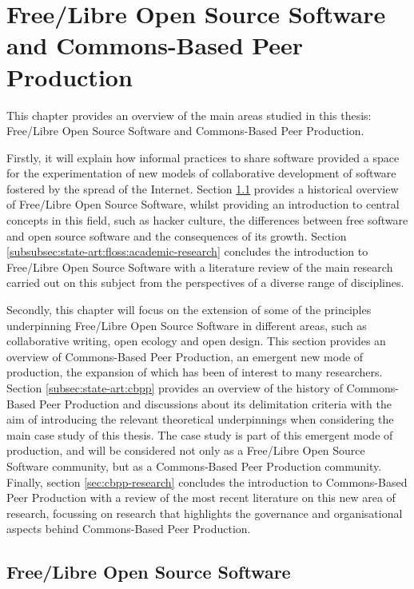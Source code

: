 \chapter{Free\slash Libre Open Source Software and Commons-Based Peer Production}
\label{chapter:introduction}

This chapter provides an overview of the main areas studied in this thesis: Free\slash Libre Open Source Software and Commons-Based Peer Production.

Firstly, it will explain how informal practices to share software provided a space for the experimentation of new models of collaborative development of software fostered by the spread of the Internet. Section \ref{subsec:state-art:floss} provides a historical overview of Free\slash Libre Open Source Software, whilst providing an introduction to central concepts in this field, such as hacker culture, the differences between free software and open source software and the consequences of its growth. Section \ref{subsubsec:state-art:floss:academic-research} concludes the introduction to Free\slash Libre Open Source Software with a literature review of the main research carried out on this subject from the perspectives of a diverse range of disciplines.

Secondly, this chapter will focus on the extension of some of the principles underpinning Free\slash Libre Open Source Software in different areas, such as collaborative writing, open ecology and open design. This section provides an overview of Commons-Based Peer Production, an emergent new mode of production, the expansion of which has been of interest to many researchers. Section \ref{subsec:state-art:cbpp} provides an overview of the history of Commons-Based Peer Production and discussions about its delimitation criteria with the aim of introducing the relevant theoretical underpinnings when considering the main case study of this thesis. The case study is part of this emergent mode of production, and will be considered not only as a Free\slash Libre Open Source Software community, but as a Commons-Based Peer Production community. Finally,  section \ref{sec:cbpp-research} concludes the introduction to Commons-Based Peer Production with a review of the most recent literature on this new area of research, focussing on research that highlights the governance and organisational aspects behind Commons-Based Peer Production.

\section{Free\slash Libre Open Source Software}
\label{subsec:state-art:floss}

